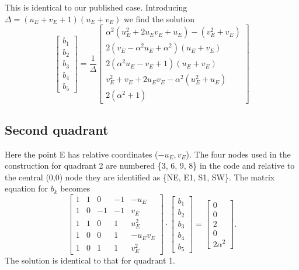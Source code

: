 \documentclass[12pt,letterpaper,margin=0.5in]{article}
\begin{document}
This is identical to our published case.  Introducing $\Delta = \left (u_E + v_E + 1 \right)\left (u_E + v_E\right)$ we find
the solution
\begin{equation}
\left[ {\begin{array}{*{20}{c}}
{{b_1}}\\
{{b_2}}\\
{{b_3}}\\
{{b_4}}\\
{{b_5}}
\end{array}} \right] = \frac{1}{\Delta }\left[ {\begin{array}{*{20}{c}}
{\alpha^2(u_E^2 + 2{u_E}{v_E} + {u_E}) - (v_E^2 + {v_E})}\\[4pt]
{2\left( {{v_E} - \alpha^2{u_E} + \alpha^2} \right)\left( {{u_E} + {v_E}} \right)}\\[4pt]
{2\left( {\alpha^2{u_E} - {v_E} + 1} \right)\left( {{u_E} + {v_E}} \right)}\\[4pt]
{v_E^2 + {v_E} + 2{u_E}{v_E} - \alpha^2(u_E^2 + {u_E})}\\[4pt]
2(\alpha^2+1)
\end{array}} \right]
\label{eq:upper}
\end{equation}
\subsection{Second quadrant}
Here the point E has relative coordinates ($-u_E, v_E$).  The four nodes used in the
construction for quadrant 2 are numbered \{3, 6, 9, 8\} in the code and relative to the central (0,0) node they
are identified as \{NE, E1, S1, SW\}. The matrix equation for $b_k$ becomes
\begin{equation}
\left[ {\begin{array}{*{20}{r}}
1&1&0&{ - 1}&{ - {u_E}}\\
1&0&{ - 1}&{ - 1}&{{v_E}}\\
1&1&0&1&{u_E^2}\\
1&0&0&1&{ - {u_E}{v_E}}\\
1&0&1&1&{v_E^2}
\end{array}} \right] \cdot \left[ {\begin{array}{*{20}{c}}
{{b_1}}\\
{{b_2}}\\
{{b_3}}\\
{{b_4}}\\
{{b_5}}
\end{array}} \right] = \left[ {\begin{array}{*{20}{c}}
0\\
0\\
2\\
0\\
2\alpha^2
\end{array}} \right].
\end{equation}
The solution is identical to that for quadrant 1.
\end{document}
